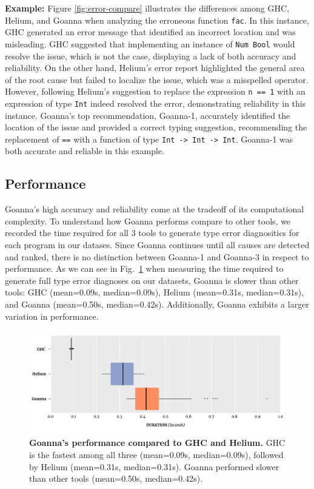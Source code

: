 \documentclass[pdflatex,lineno,sn-nature,Numbered]{sn-jnl}%
\begin{document}
\textbf{Example:} Figure \ref{fig:error-compare} illustrates the differences among GHC, Helium, and Goanna when analyzing the erroneous function {\tt fac}. In this instance, GHC generated an error message that identified an incorrect location and was misleading. GHC suggested that implementing an instance of {\tt Num Bool} would resolve the issue, which is not the case, displaying a lack of both accuracy and reliability. On the other hand, Helium's error report highlighted the general area of the root cause but failed to localize the issue, which was a misspelled operator. However, following Helium's suggestion to replace the expression {\tt n == 1} with an expression of type {\tt Int} indeed resolved the error, demonstrating reliability in this instance. Goanna's top recommendation, Goanna-1, accurately identified the location of the issue and provided a correct typing suggestion, recommending the replacement of {\tt ==} with a function of type {\tt Int -> Int -> Int}. Goanna-1 was both accurate and reliable in this example.
    
\subsection{Performance} \label{sub:eval-performance}
Goanna's high accuracy and reliability come at the tradeoff of its computational complexity. To understand how Goanna performs compare to other tools, we recorded the time required for all 3 tools to generate type error diagnositics for each program in our datases. Since Goanna continues until all causes are detected and ranked, there is no distinction between Goanna-1 and Goanna-3 in respect to performance. As we can see in Fig.~\ref{fig:performance} when measuring the time required to generate full type error diagnoses on our datasets, Goanna is slower than other tools: GHC (mean=0.09s, median=0.09s), Helium (mean=0.31s, median=0.31s), and Goanna (mean=0.50s, median=0.42s). Additionally, Goanna exhibits a larger variation in performance. 

\begin{figure}[ht!]
    \centering
    \includegraphics[width=\linewidth]{images/ToolCompare}
    \caption{{\bf Goanna's performance compared to GHC and Helium.} GHC is the fastest among all three (mean=0.09s, median=0.09s), followed by Helium (mean=0.31s, median=0.31s). Goanna performed slower than other tools (mean=0.50s, median=0.42s).}
    \label{fig:performance}
\end{figure}
\end{document}
